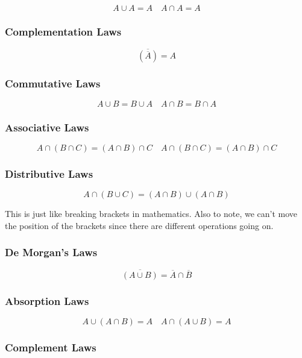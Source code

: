 \[
    A \cup A = A \quad A \cap A = A
\]

\subsubsection{Complementation Laws}\label{ssub:complementation_laws}

\[
    \overline{(\overline{A})} = A
\]

\subsubsection{Commutative Laws}\label{ssub:commutativepafour}

\[
    A \cup B = B \cup A \quad A \cap B = B\cap A
\]

\subsubsection{Associative Laws}\label{ssub:associateivepafour}

\[
    A \cap (B \cap C) = (A \cap B) \cap C \quad A \cap (B \cap C) = (A \cap B) \cap C
\]

\subsubsection{Distributive Laws}\label{ssub:distributive_laws}

\[
    A \cap (B \cup C) = (A \cap B) \cup (A \cap B)
\]
\begin{note}
    This is just like breaking brackets in mathematics. Also to note, we can't move the position of the brackets since there are different operations going on.
\end{note}

\subsubsection{De Morgan's Laws}\label{ssub:de_morgan_s_laws}

\[
    \overline{(A \cup B)} = \overline{A} \cap \overline{B}
\]

\subsubsection{Absorption Laws}\label{ssub:absorption_laws}

\[
    A \cup (A \cap B) = A \quad A \cap (A \cup B) = A
\]

\subsubsection{Complement Laws}\label{ssub:complement_laws}

